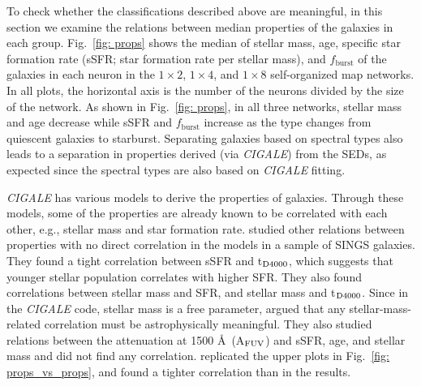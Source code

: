        To check whether the classifications described above are meaningful, in this section we examine the relations between median properties of the galaxies in each group. 
          Fig.~\ref{fig: props} shows the median of stellar mass, age, specific star formation rate (sSFR; star formation rate per stellar mass), and $f_\mathrm{burst}$ of the galaxies in each neuron in the $1\times2$, $1\times4$, and $1\times8$ self-organized map networks.
        In all plots, the horizontal axis is the number of the neurons divided by the size of the network.
        As shown in Fig.~\ref{fig: props}, in all three networks, stellar mass and age decrease while sSFR and $f_\mathrm{burst}$ increase as the type changes from quiescent galaxies to starburst.
       Separating galaxies based on spectral types also leads to a separation in properties derived (via {\em CIGALE}) from the SEDs, as expected since the spectral types are also based on {\em CIGALE} fitting. 
    

        {\em CIGALE} has various models to derive the properties of galaxies.
        Through these models, some of the properties are already known to be correlated with each other, e.g., stellar mass and star formation rate.
         studied other relations between properties with no direct correlation in the models in a sample of SINGS galaxies.
        They found a tight correlation between sSFR and t$_{\rm {D4000}}$, which suggests that younger stellar population correlates with higher SFR.
        They also found correlations between stellar mass and SFR, and stellar mass and t$_{\rm {D4000}}$.
        Since in the {\em CIGALE} code, stellar mass is a free parameter,  argued that any stellar-mass-related correlation must be astrophysically meaningful. 
        They also studied relations between the attenuation at 1500 \AA~(A$_{\rm {FUV}}$) and sSFR, age, and stellar mass and did not find any correlation.
         replicated the upper plots in Fig.~\ref{fig: props_vs_props}, and found a tighter correlation than in the  results. 
        
